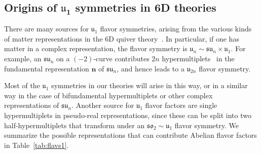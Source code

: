 \documentclass[11pt]{article}
\numberwithin{equation}{section}
\newcommand{\fu}{\mathfrak{u}}
\newcommand{\fsu}{\mathfrak{su}}
\newcommand{\fso}{\mathfrak{so}}
\begin{document}
\subsection[Origins of \texorpdfstring{$\fu_1$}{u1} flavor symmetries in 6D theories]{Origins of \texorpdfstring{$\boldsymbol{\fu_1}$}{u1} symmetries in 6D theories}
There are many sources for $\fu_1$ flavor symmetries, arising from the various kinds of matter representations in the 6D quiver theory~\cite{Lee:2018ihr,Fazzi:2020}. In particular, if one has matter in a complex representation, the flavor symmetry is $\fu_{n} \sim \fsu_{n} \times \fu_{1}$.
For example, an $\fsu_n$ on a $(-2)$-curve contributes $2n$ hypermultiplets~\cite{Johnson:2016qar} in the fundamental representation $\boldsymbol{n}$ of $\fsu_n$, and hence leads to a $\fu_{2n}$ flavor symmetry. 

Most of the $\fu_1$ symmetries in our theories will arise in this way, or in a similar way in the case of bifundamental hypermultiplets or other complex representations of $\fsu_n$. Another source for $\fu_1$ flavor factors are single hypermultiplets in pseudo-real representations, since these can be split into two half-hypermultiplets that transform under an $\fso_{2} \sim \fu_1$ flavor symmetry. We summarize the possible representations that can contribute Abelian flavor factors in Table~\ref{tab:flavs1}.
\end{document}
